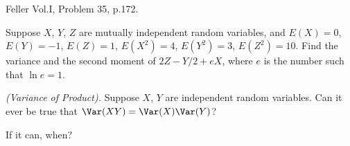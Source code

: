 \begin{problem}[Handout 8, \# 16]
  Feller Vol.\@ I, Problem 35, p.\@ 172.
\end{problem}
\begin{solution}

\end{solution}
\newpage

\begin{problem}[Handout 9, \# 3]
  Suppose \(X\), \(Y\), \(Z\) are mutually independent random variables,
  and \(E(X)=0\), \(E(Y)=-1\), \(E(Z)=1\), \(E(X^2)=4\), \(E(Y^2)=3\),
  \(E(Z^2)=10\). Find the variance and the second moment of \(2Z-Y/2+e X\),
  where \(e\) is the number such that \(\ln e=1\).
\end{problem}
\begin{solution}

\end{solution}
\newpage

\begin{problem}[Handout 9, \# 14]
  \emph{(Variance of Product).} Suppose \(X\), \(Y\) are independent
  random variables. Can it ever be true that \(\Var(XY)=\Var(X)\Var(Y)\)?

  \noindent If it can, when?
\end{problem}
\begin{solution}

\end{solution}

